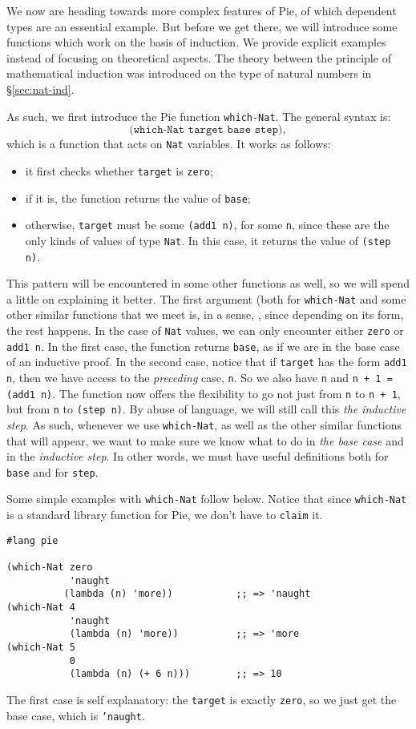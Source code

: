 We now are heading towards more complex features of Pie, of which
dependent types are an essential example. But before we get there,
we will introduce some functions which work on the basis of induction.
We provide explicit examples instead of focusing on theoretical aspects.
The theory between the principle of mathematical induction was
introduced on the type of natural numbers in \S\ref{sec:nat-ind}.

As such, we first introduce the Pie function \texttt{which-Nat}.
The general syntax is:
\[
  \texttt{(which-Nat \ target \ base \ step)},
\]
which is a function that acts on \texttt{Nat} variables.
It works as follows:
\begin{itemize}
\item it first checks whether \texttt{target} is \texttt{zero};
\item if it is, the function returns the value of \texttt{base};
\item otherwise, \texttt{target} must be some \texttt{(add1 n)},
  for some \texttt{n}, since these are the only kinds of values of type
  \texttt{Nat}. In this case, it returns the value of \texttt{(step n)}.
\end{itemize}

This pattern will be encountered in some other functions as well,
so we will spend a little on explaining it better. The first argument
(both for \texttt{which-Nat} and some other similar functions that we
meet is, in a sense, , since depending on its form,
the rest happens. In the case of \texttt{Nat} values, we can only encounter
either \texttt{zero} or \texttt{add1 n}. In the first case, the function
returns \texttt{base}, as if we are in the base case of an inductive proof.
In the second case, notice that if \texttt{target} has the form
\texttt{add1 n}, then we have access to the \emph{preceding} case, \texttt{n}.
So we also have \texttt{n} and \texttt{n + 1 = (add1 n)}. The function now
offers the flexibility to go not just from \texttt{n} to \texttt{n + 1},
but from \texttt{n} to \texttt{(step n)}. By abuse of language, we will still
call this \emph{the inductive step}. As such, whenever we use \texttt{which-Nat},
as well as the other similar functions that will appear, we want to make
sure we know what to do in \emph{the base case} and in the \emph{inductive step}.
In other words, we must have useful definitions both for \texttt{base}
and for \texttt{step}.

Some simple examples with \texttt{which-Nat} follow below. Notice that since
\texttt{which-Nat} is a standard library function for Pie, we don't have
to \texttt{claim} it.
{
  \small
\begin{verbatim}
#lang pie

(which-Nat zero
           'naught
          (lambda (n) 'more))           ;; => 'naught
(which-Nat 4
           'naught
           (lambda (n) 'more))          ;; => 'more
(which-Nat 5
           0
           (lambda (n) (+ 6 n)))        ;; => 10
\end{verbatim}
}
The first case is self explanatory: the \texttt{target} is exactly
\texttt{zero}, so we just get the base case, which is \texttt{'naught}.

